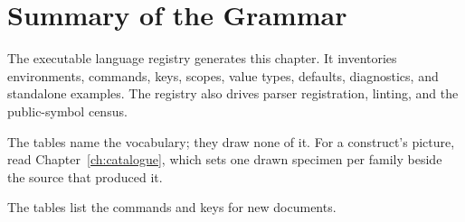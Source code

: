 \section{Summary of the Grammar}\label{ch:reference}

The executable language registry generates this chapter.  It inventories
environments, commands, keys, scopes, value types, defaults, diagnostics, and
standalone examples.  The registry also drives parser registration, linting,
and the public-symbol census.

The tables name the vocabulary; they draw none of it.  For a construct's
picture, read Chapter~\ref{ch:catalogue}, which sets one drawn specimen per
family beside the source that produced it.


The tables list the commands and keys for new documents.
